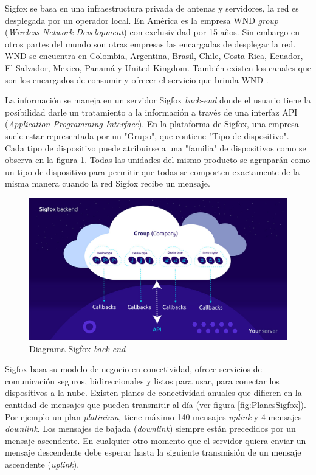 Sigfox se basa en una infraestructura privada de antenas y servidores, la red es desplegada por un operador local. En América es la empresa WND \textit{group } (\textit{Wireless Network Development}) con exclusividad por 15 años. Sin embargo en otros partes del mundo son otras empresas las encargadas de desplegar la red. WND se encuentra en Colombia, Argentina, Brasil, Chile, Costa Rica, Ecuador, El Salvador, Mexico, Panamá y United Kingdom. También existen los canales que son los encargados de consumir y ofrecer el servicio que brinda WND \citep{SigfoxCoverage}. 

La información se maneja en un servidor Sigfox  \textit{back-end} donde el usuario tiene la posibilidad darle un tratamiento a la información a través de una interfaz API (\textit{Application Programming Interface}). En la plataforma de Sigfox, una empresa suele estar representada por un "Grupo", que contiene "Tipo de dispositivo". Cada tipo de dispositivo puede atribuirse a una "familia" de dispositivos como se observa en la figura \ref{fig:backendSigfox}. Todas las unidades del mismo producto se agruparán como un tipo de dispositivo para permitir que todas se comporten exactamente de la misma manera cuando la red Sigfox recibe un mensaje. 
\begin{figure}[h]
	\centering
	\includegraphics[scale=.35]{./Figures/backendSigfox.jpg}
	\caption{Diagrama Sigfox \textit{back-end} \protect\footnotemark}
	\label{fig:backendSigfox}
\end{figure}

Sigfox basa su modelo de negocio en conectividad, ofrece servicios de comunicación seguros, bidireccionales y listos para usar, para conectar los dispositivos a la nube. Existen planes de conectividad anuales que difieren en la cantidad de mensajes que pueden transmitir al día (ver figura \ref{fig:PlanesSigfox}). Por ejemplo un plan \textit{platinium}, tiene máximo 140 mensajes \textit{uplink} y 4 mensajes \textit{downlink}. Los mensajes de bajada (\textit{downlink}) siempre están precedidos por un mensaje ascendente. En cualquier otro momento que el servidor quiera enviar un mensaje descendente debe esperar hasta la siguiente transmisión de un mensaje ascendente (\textit{uplink}).

